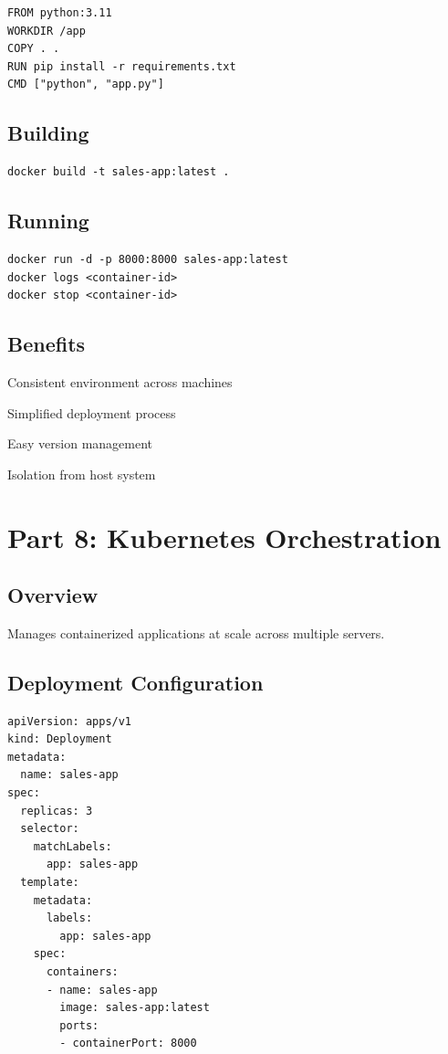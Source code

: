 \documentclass{article}
\begin{document}
\begin{verbatim}
FROM python:3.11
WORKDIR /app
COPY . .
RUN pip install -r requirements.txt
CMD ["python", "app.py"]
\end{verbatim}

\subsection{Building}

\begin{verbatim}
docker build -t sales-app:latest .
\end{verbatim}

\subsection{Running}

\begin{verbatim}
docker run -d -p 8000:8000 sales-app:latest
docker logs <container-id>
docker stop <container-id>
\end{verbatim}

\subsection{Benefits}

Consistent environment across machines

Simplified deployment process

Easy version management

Isolation from host system

\section{Part 8: Kubernetes Orchestration}

\subsection{Overview}

Manages containerized applications at scale across multiple servers.

\subsection{Deployment Configuration}

\begin{verbatim}
apiVersion: apps/v1
kind: Deployment
metadata:
  name: sales-app
spec:
  replicas: 3
  selector:
    matchLabels:
      app: sales-app
  template:
    metadata:
      labels:
        app: sales-app
    spec:
      containers:
      - name: sales-app
        image: sales-app:latest
        ports:
        - containerPort: 8000
\end{verbatim}
\end{document}

